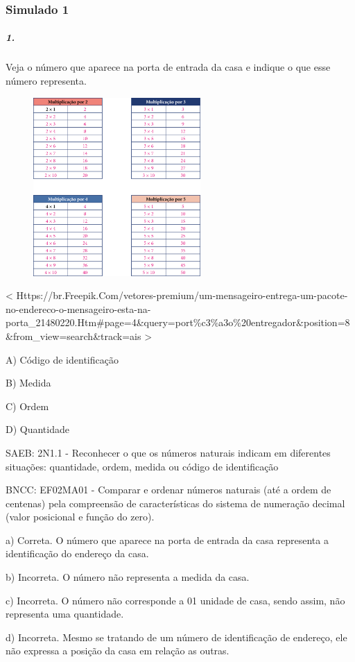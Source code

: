 \subsubsection{Simulado 1}\label{simulado-1}

\subparagraph{1. }\label{section-100}

Veja o número que aparece na porta de entrada da casa e indique o que
esse número representa.

\includegraphics[width=3.34635in,height=2.67708in]{media/image105.png}

\textless{}
Https://br.Freepik.Com/vetores-premium/um-mensageiro-entrega-um-pacote-no-endereco-o-mensageiro-esta-na-porta\_21480220.Htm\#page=4\&query=port\%c3\%a3o\%20entregador\&position=8\&from\_view=search\&track=ais
\textgreater{}

A) Código de identificação

B) Medida

C) Ordem

D) Quantidade

SAEB: 2N1.1 - Reconhecer o que os números naturais indicam em diferentes
situações: quantidade, ordem, medida ou código de identificação

BNCC: EF02MA01 - Comparar e ordenar números naturais (até a ordem de
centenas) pela compreensão de características do sistema de numeração
decimal (valor posicional e função do zero).

a) Correta. O número que aparece na porta de entrada da casa representa
a identificação do endereço da casa.

b) Incorreta. O número não representa a medida da casa.

c) Incorreta. O número não corresponde a 01 unidade de casa, sendo
assim, não representa uma quantidade.

d) Incorreta. Mesmo se tratando de um número de identificação de
endereço, ele não expressa a posição da casa em relação as outras.

